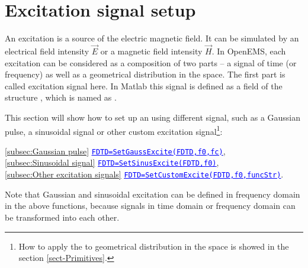\section{Excitation signal setup} \label{sec:FDTD_Excitation}
An excitation is a source of the electric magnetic field. It can be simulated by an electrical field intensity $\vec{E}$ or a magnetic field intensity $\vec{H}$. In OpenEMS, each excitation can be considered as a composition of two parts -- a signal of time (or frequency) as well as a geometrical distribution in the space. The first part is called excitation signal here.
In Matlab this signal is defined as a field of the structure , which is named as .  \label{para:Excitation}%

This section will show how to set up an  using different signal, such as a Gaussian pulse, a sinusoidal signal or other custom excitation signal\footnote{How to apply the  to geometrical distribution in the space is showed in the section \ref{sect-Primitives}.}:
       \begin{myindentpar}
\ref{subsec:Gaussian pulse} \hspace{1cm} \hyperref[subsec:Gaussian pulse]{\textcolor{blue}{\underline{\texttt{FDTD=SetGaussExcite(FDTD,f0,fc)}}}}, \\
\ref{subsec:Sinusoidal signal} \hspace{1cm} \hyperref[subsec:Sinusoidal signal]{\textcolor{blue}{\underline{\texttt{FDTD=SetSinusExcite(FDTD,f0)}}}},\\
\ref{subsec:Other excitation signals} \hspace{1cm} \hyperref[subsec:Other excitation signals]{\textcolor{blue}{\underline{\texttt{FDTD=SetCustomExcite(FDTD,f0,funcStr)}}}}.
       \end{myindentpar}
Note that Gaussian and sinusoidal excitation can be defined in frequency domain in the above functions, because signals in time domain or frequency domain can be transformed into each other.\\
